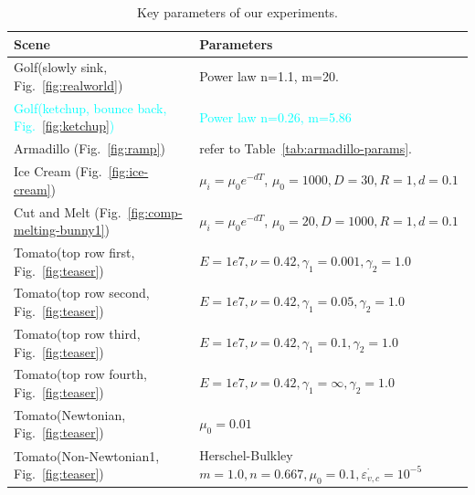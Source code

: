 \documentclass[10pt,journal,compsoc]{IEEEtran}
\newcommand{\revised}[1]{{\textcolor{cyan}{#1}}}
\begin{document}
\begin{table}[htbp]
	\caption{Key parameters of our experiments.}
	\centering
	\begin{tabular}{ll}
		\toprule\label{tab:parameters}
		Scene                                                            & Parameters                                                                                \\
		\midrule
		Golf(slowly sink, Fig.~\ref{fig:realworld})                      & Power law n=1.1, m=20.                                                                    \\
		\revised{Golf(ketchup, bounce back, Fig.~\ref{fig:ketchup})} & \revised{Power law n=0.26, m=5.86~\cite{Bottiglieri1991}}                                  \\
		Armadillo (Fig.~\ref{fig:ramp})                                  & refer to Table~\ref{tab:armadillo-params}.                                                \\
		Ice Cream (Fig.~\ref{fig:ice-cream})                             & $\mu_i = \mu_0 e^{-d T}$, $\mu_0=1000, D=30, R=1, d=0.1$                                  \\
		Cut and Melt (Fig.~\ref{fig:comp-melting-bunny1})                & $\mu_i = \mu_0 e^{-d T}$, $\mu_0=20, D=1000, R=1, d=0.1$                                  \\
		Tomato(top row first, Fig.~\ref{fig:teaser})                     & $E=1e7, \nu=0.42, \gamma_1=0.001, \gamma_2 = 1.0$                                         \\
		Tomato(top row second, Fig.~\ref{fig:teaser})                    & $E=1e7, \nu=0.42, \gamma_1=0.05, \gamma_2 = 1.0$                                          \\
		Tomato(top row third, Fig.~\ref{fig:teaser})                     & $E=1e7, \nu=0.42, \gamma_1=0.1, \gamma_2 = 1.0$                                           \\
		Tomato(top row fourth, Fig.~\ref{fig:teaser})                    & $E=1e7, \nu=0.42, \gamma_1=\infty, \gamma_2 = 1.0$                                        \\
		Tomato(Newtonian, Fig.~\ref{fig:teaser})                         & $\mu_0=0.01$                                                                              \\
		Tomato(Non-Newtonian1, Fig.~\ref{fig:teaser})                    & Herschel-Bulkley $m=1.0, n=0.667, \mu_0=0.1, \dot{\varepsilon_{v,c}}=10^{-5}$             \\

\end{tabular}
\end{table}
\end{document}
